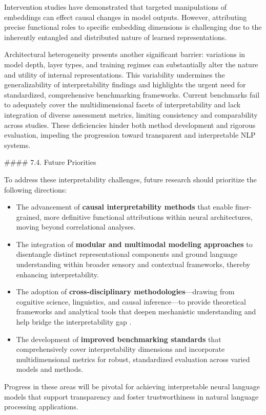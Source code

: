 \documentclass[11pt]{article}
\begin{document}
Intervention studies have demonstrated that targeted manipulations of embeddings can effect causal changes in model outputs. However, attributing precise functional roles to specific embedding dimensions is challenging due to the inherently entangled and distributed nature of learned representations.

Architectural heterogeneity presents another significant barrier: variations in model depth, layer types, and training regimes can substantially alter the nature and utility of internal representations. This variability undermines the generalizability of interpretability findings and highlights the urgent need for standardized, comprehensive benchmarking frameworks. Current benchmarks fail to adequately cover the multidimensional facets of interpretability and lack integration of diverse assessment metrics, limiting consistency and comparability across studies. These deficiencies hinder both method development and rigorous evaluation, impeding the progression toward transparent and interpretable NLP systems.

#### 7.4. Future Priorities

To address these interpretability challenges, future research should prioritize the following directions:

\begin{itemize}
  \item The advancement of \textbf{causal interpretability methods} that enable finer-grained, more definitive functional attributions within neural architectures, moving beyond correlational analyses.
  \item The integration of \textbf{modular and multimodal modeling approaches} to disentangle distinct representational components and ground language understanding within broader sensory and contextual frameworks, thereby enhancing interpretability.
  \item The adoption of \textbf{cross-disciplinary methodologies}—drawing from cognitive science, linguistics, and causal inference—to provide theoretical frameworks and analytical tools that deepen mechanistic understanding and help bridge the interpretability gap \cite{ref36}.
  \item The development of \textbf{improved benchmarking standards} that comprehensively cover interpretability dimensions and incorporate multidimensional metrics for robust, standardized evaluation across varied models and methods.
\end{itemize}

Progress in these areas will be pivotal for achieving interpretable neural language models that support transparency and foster trustworthiness in natural language processing applications.
\end{document}
